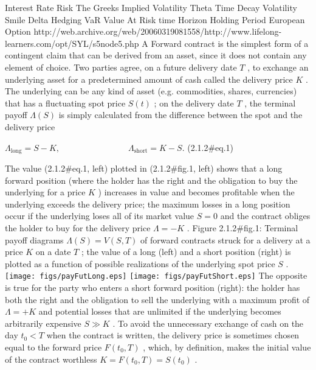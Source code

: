 
Interest Rate Risk
The Greeks
Implied Volatility
Theta Time Decay
Volatility Smile
Delta Hedging
VaR
Value At Risk
time Horizon
Holding Period
European Option
http://web.archive.org/web/20060319081558/http://www.lifelong-learners.com/opt/SYL/s5node5.php
A Forward contract is the simplest form of a contingent claim that can be derived from an asset, since it does not contain any element of choice. Two parties agree, on a future delivery date $ T$ , to exchange an underlying asset for a predetermined amount of cash called the delivery price $ K$ . The underlying can be any kind of asset (e.g. commodities, shares, currencies) that has a fluctuating spot price $ S(t)$ ; on the delivery date $ T$ , the terminal payoff $ \Lambda (S)$ is simply calculated from the difference between the spot and the delivery price

 $\displaystyle \Lambda_\mathrm{long}=S-K, \qquad\qquad\qquad\qquad \Lambda_\mathrm{short}=K-S.$	 (2.1.2#eq.1)

The value (2.1.2#eq.1, left) plotted in (2.1.2#fig.1, left) shows that a long forward position (where the holder has the right and the obligation to buy the underlying for a price $ K$ ) increases in value and becomes profitable when the underlying exceeds the delivery price; the maximum losses in a long position occur if the underlying loses all of its market value $ S=0$ and the contract obliges the holder to buy for the delivery price  $ \Lambda=-K$ .
Figure 2.1.2#fig.1: Terminal payoff diagrams  $ \Lambda (S)=V(S,T)$ of forward contracts struck for a delivery at a price $ K$ on a date $ T$ ; the value of a long (left) and a short position (right) is plotted as a function of possible realizations of the underlying spot price $ S$ .
\texttt{[image: figs/payFutLong.eps]}        \texttt{[image: figs/payFutShort.eps]}
The opposite is true for the party who enters a short forward position (right): the holder has both the right and the obligation to sell the underlying with a maximum profit of  $ \Lambda=+K$ and potential losses that are unlimited if the underlying becomes arbitrarily expensive $ S\gg K$ . To avoid the unnecessary exchange of cash on the day $ t_0<T$ when the contract is written, the delivery price is sometimes chosen equal to the forward price $ F(t_0,T)$ , which, by definition, makes the initial value of the contract worthless  $ K=F(t_0,T)=S(t_0)$ .

